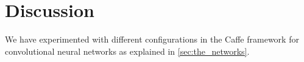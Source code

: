 \graphicspath{{Chapters/Project/}}

\section{Discussion} %
\label{sec:discussion}

We have experimented with different configurations in the Caffe framework for convolutional neural
networks as explained in \autoref{sec:the_networks}.  
 


